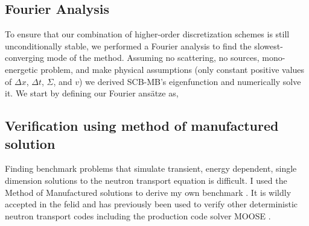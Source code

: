 \subsection{Fourier Analysis}

To ensure that our combination of higher-order discretization schemes is still unconditionally stable, we performed a Fourier analysis to find the slowest-converging mode of the method.
Assuming no scattering, no sources, mono-energetic problem, and make physical assumptions (only constant positive values of $\Delta x$, $\Delta t$, $\Sigma$, and $v$) we derived SCB-MB's eigenfunction and numerically solve it. 
We start by defining our Fourier ansätze as,

\subsection{Verification using method of manufactured solution}

Finding benchmark problems that simulate transient, energy dependent, single dimension solutions to the neutron transport equation is difficult.
I used the Method of Manufactured solutions to derive my own benchmark \citep{roy_review_2005}.
It is wildly accepted in the felid \cite{nse_mms_warsaw} and has previously been used to verify other deterministic neutron transport codes including the production code solver MOOSE \citep{wang_application_2018,moosemms}.

